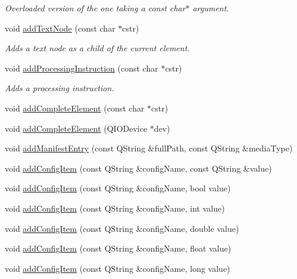 \begin{CompactItemize}
\begin{CompactList}\small\item\em Overloaded version of the one taking a const char$\ast$ argument. \item\end{CompactList}\item 
void \hyperlink{classKoXmlWriter_354008d8e086577751b2cbee5bf973f2}{addTextNode} (const char $\ast$cstr)
\begin{CompactList}\small\item\em Adds a text node as a child of the current element. \item\end{CompactList}\item 
void \hyperlink{classKoXmlWriter_ded4a15ee74b3dbd14cd0965d1ee471f}{addProcessingInstruction} (const char $\ast$cstr)
\begin{CompactList}\small\item\em Adds a processing instruction. \item\end{CompactList}\item 
void \hyperlink{classKoXmlWriter_cc98c1f1d995a792c7a0e4b2945954ff}{addCompleteElement} (const char $\ast$cstr)
\item 
void \hyperlink{classKoXmlWriter_0bc25d326f56ee58c095d2e6287d6b7d}{addCompleteElement} (QIODevice $\ast$dev)
\item 
void \hyperlink{classKoXmlWriter_168885626dde5e2432e9a2789b70715a}{addManifestEntry} (const QString \&fullPath, const QString \&mediaType)
\item 
void \hyperlink{classKoXmlWriter_edfa20fc47c415db42871b8ff0d97e8d}{addConfigItem} (const QString \&configName, const QString \&value)
\item 
void \hyperlink{classKoXmlWriter_2d1cc2de755ca456ca0f5bd8d81414ce}{addConfigItem} (const QString \&configName, bool value)
\item 
void \hyperlink{classKoXmlWriter_14522a8ea1c3b25e299319653ba9af9e}{addConfigItem} (const QString \&configName, int value)
\item 
void \hyperlink{classKoXmlWriter_3b08df454948731cdf29026298798540}{addConfigItem} (const QString \&configName, double value)
\item 
void \hyperlink{classKoXmlWriter_3f5fa5e7f6283055cd09c94c8f67206f}{addConfigItem} (const QString \&configName, float value)
\item 
void \hyperlink{classKoXmlWriter_96dd3ec071587e931296ce5e2b18c1e3}{addConfigItem} (const QString \&configName, long value)

\end{CompactItemize}
